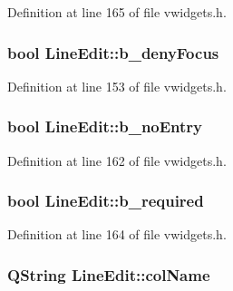 Definition at line 165 of file vwidgets.h.

\hypertarget{classLineEdit_a4769336d33259d543b795da2831fe4f7}{
\subsubsection[{b\_\-denyFocus}]{\setlength{\rightskip}{0pt plus 5cm}bool {\bf LineEdit::b\_\-denyFocus}}}
\label{classLineEdit_a4769336d33259d543b795da2831fe4f7}


Definition at line 153 of file vwidgets.h.

\hypertarget{classLineEdit_a86b1ba413925186833fa1ffe1d08fe23}{
\subsubsection[{b\_\-noEntry}]{\setlength{\rightskip}{0pt plus 5cm}bool {\bf LineEdit::b\_\-noEntry}}}
\label{classLineEdit_a86b1ba413925186833fa1ffe1d08fe23}


Definition at line 162 of file vwidgets.h.

\hypertarget{classLineEdit_a54067fa92f09cdde4c4f900333a1af5d}{
\subsubsection[{b\_\-required}]{\setlength{\rightskip}{0pt plus 5cm}bool {\bf LineEdit::b\_\-required}}}
\label{classLineEdit_a54067fa92f09cdde4c4f900333a1af5d}


Definition at line 164 of file vwidgets.h.

\hypertarget{classLineEdit_a18b45b2581575cf88489ab3a6f15281f}{
\subsubsection[{colName}]{\setlength{\rightskip}{0pt plus 5cm}QString {\bf LineEdit::colName}}}
\label{classLineEdit_a18b45b2581575cf88489ab3a6f15281f}


